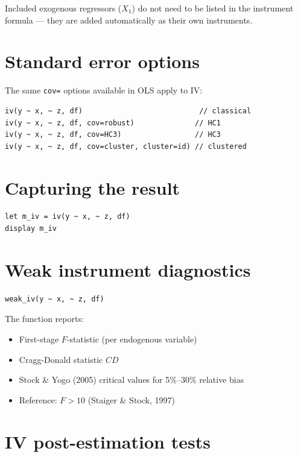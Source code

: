 \begin{nota}
  Included exogenous regressors ($X_1$) do not need to be listed in the
  instrument formula --- they are added automatically as their own
  instruments.
\end{nota}

\section{Standard error options}

The same \lstinline{cov=} options available in OLS apply to IV:

\begin{lstlisting}
iv(y ~ x, ~ z, df)                           // classical
iv(y ~ x, ~ z, df, cov=robust)              // HC1
iv(y ~ x, ~ z, df, cov=HC3)                 // HC3
iv(y ~ x, ~ z, df, cov=cluster, cluster=id) // clustered
\end{lstlisting}

\section{Capturing the result}

\begin{lstlisting}
let m_iv = iv(y ~ x, ~ z, df)
display m_iv
\end{lstlisting}

\section{Weak instrument diagnostics}

\begin{lstlisting}[caption={Weak instrument test}]
weak_iv(y ~ x, ~ z, df)
\end{lstlisting}

The function reports:
\begin{itemize}
  \item First-stage $F$-statistic (per endogenous variable)
  \item Cragg-Donald statistic $CD$
  \item Stock \& Yogo (2005) critical values for 5\%--30\% relative bias
  \item Reference: $F > 10$ (Staiger \& Stock, 1997)
\end{itemize}

\section{IV post-estimation tests}

